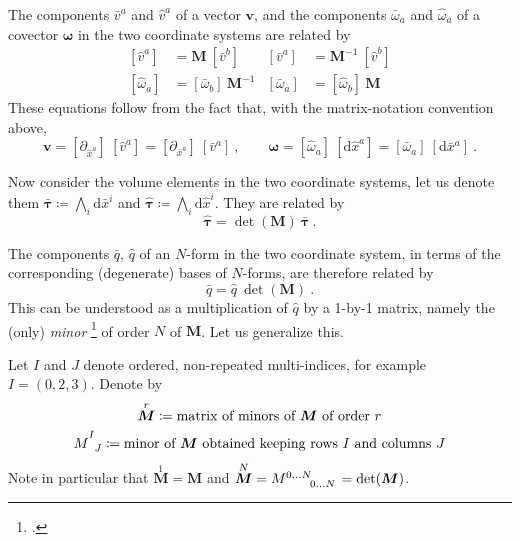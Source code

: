 \documentclass[\ifafour a4paper,12pt,\else a5paper,10pt,\fi%
onecolumn,oneside,article,%
british%
]{memoir}
\theoremstyle{remark}
\theoremstyle{innote}
\newcommand*{\citep}{\footcites}
\newcommand*{\de}{\partialup}%
\newcommand*{\di}{\mathrm{d}}%
\newcommand*{\defd}{\coloneqq}
\renewcommand*{\|}[1][]{\nonscript\,#1\vert\nonscript\;\mathopen{}}
\newcommand*{\sect}{\S}%
\newcommand*{\hx}{\hat{x}}
\newcommand*{\lx}{\bar{x}}
\renewcommand*{\i}{\indices}
\newcommand*{\mino}[2][]{\overset{#1}{#2}}
\begin{document}
The components $\bar{v}^{a}$ and $\hat{v}^{a}$ of a vector $\bm{v}$, and the
components $\bar{\omega}_{a}$ and $\hat{\omega}_{a}$ of a covector $\bm{\omega}$
in the two coordinate systems are related by
\begin{align}
  \label{eq:comp_vec_tr}
  [\hat{v}^{a}] &= \bm{M}\ [\bar{v}^{b}]
  &
    [\bar{v}^{a}] &= \bm{M}^{-1}\ [\hat{v}^{b}]
  \\
  \label{eq:comp_covec_tr}
  [\hat{\omega}_{a}] &= [\bar{\omega}_{b}]\ \bm{M}^{-1}
  &
    [\bar{\omega}_{a}] &= [\hat{\omega}_{b}]\ \bm{M}
\end{align}
These equations follow from the fact that, with the matrix-notation
convention above,
\begin{equation}
  \label{eq:matrix_comps}
  \bm{v} = [\de_{\hx^{a}}]\ [\hat{v}^{a}] = [\de_{\lx^{a}}]\ [\bar{v}^{a}]
  \ ,
  \qquad
  \bm{\omega} = [\hat{\omega}_{a}]\ [\di\hx^{a}] = [\bar{\omega}_{a}]\
  [\di\lx^{a}]
  \ .
\end{equation}

\bigskip

Now consider the volume elements in the two coordinate systems, let us
denote them $\bar{\bm{\tau}} \defd \bigwedge_{i} \di \lx^{i}$ and $\hat{\bm{\tau}}
\defd \bigwedge_{i} \di \hx^{i}$. They are related by
\begin{equation}
  \label{eq:base_coord_vol_tr}
  \hat{\bm{\tau}} = \det(\bm{M})\ \bar{\bm{\tau}} \ .
\end{equation}

The components $\bar{q}$, $\hat{q}$ of an $N$-form in the two coordinate system, in
terms of the corresponding (degenerate) bases of $N$-forms, are therefore
related by
\begin{equation}
  \label{eq:comp_vol_tr}
  \bar{q} = \hat{q}\ \det(\bm{M}) \ .
\end{equation}
This can be understood as a multiplication of $\hat{q}$ by a 1-by-1 matrix, namely
the (only) \emph{minor} \citep[\sect~0.7.1]{hornetal1985_r2013} of order
$N$ of $\bm{M}$. Let us generalize this.

\bigskip

Let $I$ and $J$ denote ordered, non-repeated multi-indices, for example
$I= (0,2,3)$. Denote by
\begin{gather}
  \label{eq:minor_det}
  \mino[r]{\bm{M}} \defd
  \text{matrix of minors of $\bm{M}$ of order $r$}
  \\
  \label{eq:comp_minor_det}
 \mino{M}\i{^{I}_{J}} \defd
  \text{minor of $\bm{M}$ obtained keeping rows $I$ and columns $J$}
\end{gather}
Note in particular that $\mino[1]{\bm{M}} = \bm{M}$ and
$\mino[N]{\bm{M}}=M\i{^{0\dotso N}_{0\dotso N}} = \det(\bm{M})$.
\end{document}
